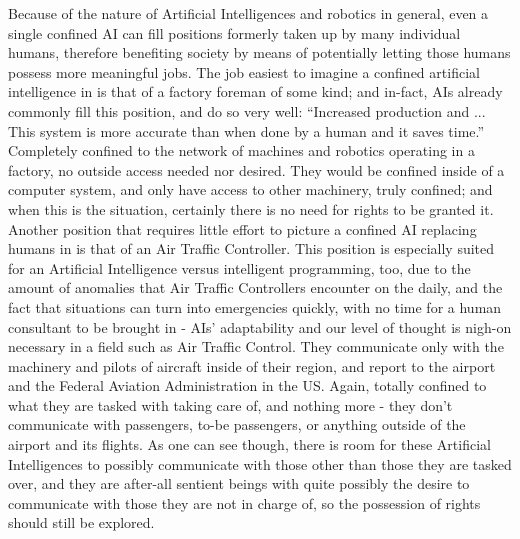 Because of the nature of Artificial Intelligences and robotics in general, even a single confined AI can fill positions formerly taken up by many individual humans, therefore benefiting society by means of potentially letting those humans possess more meaningful jobs. The job easiest to imagine a confined artificial intelligence in is that of a factory foreman of some kind; and in-fact, AIs already commonly fill this position, and do so very well: “Increased production and ... This system is more accurate than when done by a human and it saves time.” \cite{teresacattaneo2002} Completely confined to the network of machines and robotics operating in a factory, no outside access needed nor desired. They would be confined inside of a computer system, and only have access to other machinery, truly confined; and when this is the situation, certainly there is no need for rights to be granted it. Another position that requires little effort to picture a confined AI replacing humans in is that of an Air Traffic Controller. This position is especially suited for an Artificial Intelligence versus intelligent programming, too, due to the amount of anomalies that Air Traffic Controllers encounter on the daily, and the fact that situations can turn into emergencies quickly, with no time for a human consultant to be brought in - AIs' adaptability and our level of thought is nigh-on necessary in a field such as Air Traffic Control. They communicate only with the machinery and pilots of aircraft inside of their region, and report to the airport and the Federal Aviation Administration in the US. Again, totally confined to what they are tasked with taking care of, and nothing more - they don't communicate with passengers, to-be passengers, or anything outside of the airport and its flights. As one can see though, there is room for these Artificial Intelligences to possibly communicate with those other than those they are tasked over, and they are after-all sentient beings with quite possibly the desire to communicate with those they are not in charge of, so the possession of rights should still be explored.